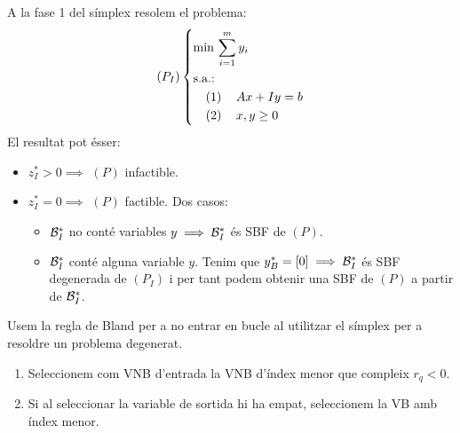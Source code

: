 \begin{obs}
    A la fase 1 del símplex resolem el problema:
    \begin{equation*}
        \lp P_I \rp \begin{dcases*}
            \min\, \sum_{i = 1}^m y_i \\
            \text{s.a.: } \\
            \quad \left( 1 \right) \quad Ax + Iy = b \\
            \quad \left( 2 \right) \quad x, y \geq 0 \\
        \end{dcases*}
    \end{equation*}
    El resultat pot ésser:
    \begin{itemize}
        \item $z_I^* > 0 \implies$ $\left(P\right)$ infactible.
        \item $z_I^* = 0 \implies$ $\left(P\right)$ factible. Dos casos:
            \begin{itemize}
                \item $\mathcal{B}_I^*$ no conté variables $y \implies \mathcal{B}_I^*$ és SBF de $\left(P\right)$.
                \item $\mathcal{B}_I^*$ conté alguna variable $y$. Tenim que $y_B^* = \left[0\right] \implies \mathcal{B}_I^*$ és SBF degenerada de $\left(P_I\right)$ i per tant podem obtenir una SBF de $\left(P\right)$ a partir de $\mathcal{B}_I^*$.
            \end{itemize}
    \end{itemize}
\end{obs}
\begin{rgl}[de Bland] \label{rgl:bland}
    Usem la regla de Bland per a no entrar en bucle al utilitzar el símplex per a resoldre un problema degenerat.
    \begin{enumerate}
        \item Seleccionem com VNB d'entrada la VNB d'índex menor que compleix $r_q < 0$.
        \item Si al seleccionar la variable de sortida hi ha empat, seleccionem la VB amb índex menor.
    \end{enumerate}
\end{rgl}